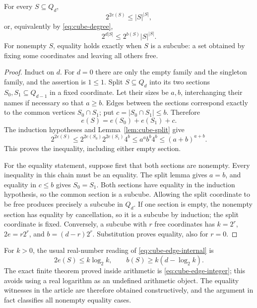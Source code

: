 \begin{theorem}
\label{thm:cube-edge}
For every \(S\subseteq Q_d\),
\begin{equation}\label{eq:cube-edge-internal}
 2^{2e(S)}\leq |S|^{|S|},
\end{equation}
or, equivalently by \eqref{eq:cube-degree},
\begin{equation}\label{eq:cube-edge-integer}
 2^{d|S|}\leq 2^{b(S)}|S|^{|S|}.
\end{equation}
For nonempty \(S\), equality holds exactly when \(S\) is a subcube:
a set obtained by fixing some coordinates and leaving all others free.
\end{theorem}
\begin{proof}
Induct on \(d\).  For \(d=0\) there are only the empty family and the
singleton family, and the assertion is \(1\leq1\).
Split \(S\subseteq Q_d\) into its two sections \(S_0,S_1\subseteq Q_{d-1}\)
in a fixed coordinate.  Let their sizes be \(a,b\), interchanging their
names if necessary so that \(a\geq b\).  Edges between the sections
correspond exactly to the common vertices \(S_0\cap S_1\); put
\(c=|S_0\cap S_1|\leq b\).  Therefore
\[
 e(S)=e(S_0)+e(S_1)+c.
\]
The induction hypotheses and Lemma~\ref{lem:cube-split} give
\[
 2^{2e(S)}
 \leq 2^{2e(S_0)}2^{2e(S_1)}4^b
 \leq a^a b^b4^b
 \leq(a+b)^{a+b}.
\]
This proves the inequality, including either empty section.

For the equality statement, suppose first that both sections are nonempty.
Every inequality in this chain must be an equality.  The split lemma gives
\(a=b\), and equality in \(c\leq b\) gives \(S_0=S_1\).
Both sections have equality in the induction hypothesis, so the common
section is a subcube.  Allowing the split coordinate to be free produces
precisely a subcube in \(Q_d\).  If one section is empty, the nonempty
section has equality by cancellation, so it is a subcube by induction;
the split coordinate is fixed.  Conversely, a subcube with \(r\) free
coordinates has \(k=2^r\), \(2e=r2^r\), and
\(b=(d-r)2^r\).  Substitution proves equality, also for \(r=0\).
\end{proof}

For \(k>0\), the usual real-number reading of
\eqref{eq:cube-edge-internal} is
\[
 2e(S)\leq k\log_2 k,
 \qquad b(S)\geq k(d-\log_2 k).
\]
The exact finite theorem proved inside arithmetic is
\eqref{eq:cube-edge-integer}; this avoids using a real logarithm as an
undefined arithmetic object.  The equality witnesses in the article are
therefore obtained constructively, and the argument in fact classifies
all nonempty equality cases.

